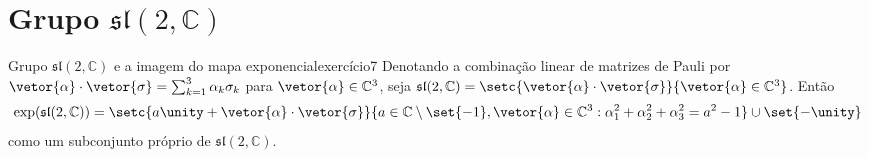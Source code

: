 \section[Grupo SL(2, C)]{Grupo \(\mathfrak{sl}(2, \mathbb{C})\)}
\begin{proposition}{Grupo \(\mathfrak{sl}(2, \mathbb{C})\) e a imagem do mapa exponencial}{exercício7}
    Denotando a combinação linear de matrizes de Pauli por \(\vetor{\alpha} \cdot \vetor{\sigma} = \sum_{k = 1}^3 \alpha_k \sigma_k\) para \(\vetor{\alpha} \in \mathbb{C}^3\), seja \(\mathfrak{sl}(2,\mathbb{C}) = \setc{\vetor{\alpha}\cdot\vetor{\sigma}}{\vetor{\alpha}\in \mathbb{C}^3}\). Então
    \begin{equation*}
        \exp(\mathfrak{sl}(2,\mathbb{C})) = \setc{a\unity + \vetor{\alpha}\cdot\vetor{\sigma}}{a \in \mathbb{C}\setminus\set{-1}, \vetor{\alpha} \in \mathbb{C}^3 : \alpha_1^2 + \alpha_2^2 + \alpha_3^2 = a^2 - 1}\cup\set{-\unity}
    \end{equation*}
    como um subconjunto próprio de \(\mathfrak{sl}(2,\mathbb{C})\).
\end{proposition}
